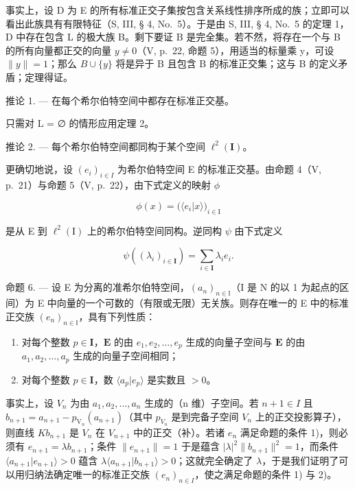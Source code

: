 事实上，设 D 为 E 的所有标准正交子集按包含关系线性排序所成的族；立即可以看出此族具有有限特征（S, III, § 4, No.~5）。于是由 S, III, § 4, No.~5 的定理 1，D 中存在包含 L 的极大族 B。剩下要证 B 是完全集。若不然，将存在一个与 B 的所有向量都正交的向量 \(y \neq 0\)（V, p.~22, 命题 5），用适当的标量乘 y，可设 \(\|y\| = 1\)；那么 \(B \cup \{y\}\) 将是异于 B 且包含 B 的标准正交集；这与 B 的定义矛盾；定理得证。

推论 1. --- 在每个希尔伯特空间中都存在标准正交基。

只需对 L = ∅ 的情形应用定理 2。

推论 2. --- 每个希尔伯特空间都同构于某个空间 \(\ell^2 (\mathbf{I})\)。

更确切地说，设 \((e_{i})_{i\in I}\) 为希尔伯特空间 E 的标准正交基。由命题 4（V, p.~21）与命题 5（V, p.~22），由下式定义的映射 \(\phi\)

\[
\phi (x) = \big (\langle e _ {i} | x \rangle \big) _ {i \in \mathrm{I}}\tag{4}
\]

是从 E 到 \(\ell^2 (\mathrm{I})\) 上的希尔伯特空间同构。逆同构 \(\psi\) 由下式定义

\[
\psi ((\lambda_ {i}) _ {i \in \mathbf {I}}) = \sum_ {i \in \mathbf {I}} \lambda_ {i} e _ {i}.\tag{5}
\]

命题 6. --- 设 E 为分离的准希尔伯特空间，\((a_{n})_{n\in\mathbb{I}}\)（I 是 N 的以 1 为起点的区间）为 E 中向量的一个可数的（有限或无限）无关族。则存在唯一的 E 中的标准正交族 \((e_{n})_{n\in\mathbb{I}}\)，具有下列性质：

\begin{enumerate}
\def\labelenumi{\arabic{enumi})}
\item
  对每个整数 \(p \in \mathbf{I}\)，\(\mathbf{E}\) 的由 \(e_1, e_2, \ldots, e_p\) 生成的向量子空间与 \(\mathbf{E}\) 的由 \(a_1, a_2, \ldots, a_p\) 生成的向量子空间相同；
\item
  对每个整数 \(p \in \mathbf{I}\)，数 \(\langle a_p | e_p \rangle\) 是实数且 \(> 0\)。
\end{enumerate}

事实上，设 \(V_{n}\) 为由 \(a_{1}, a_{2}, ..., a_{n}\) 生成的（n 维）子空间。若 \(n + 1 \in I\) 且 \(b_{n+1} = a_{n+1} - p_{\mathrm{V}_{n}}(a_{n+1})\)（其中 \(p_{V_{n}}\) 是到完备子空间 \(V_{n}\) 上的正交投影算子），则直线 \(Kb_{n+1}\) 是 \(V_{n}\) 在 \(V_{n+1}\) 中的正交（补）。若诸 \(e_{n}\) 满足命题的条件 1)，则必须有 \(e_{n+1} = \lambda b_{n+1}\)；条件 \(\|e_{n+1}\| = 1\) 于是蕴含 \(|\lambda|^2 \|b_{n+1}\|^2 = 1\)，而条件 \(\langle a_{n+1}|e_{n+1} \rangle > 0\) 蕴含 \(\lambda \langle a_{n+1}|b_{n+1} \rangle > 0\)；这就完全确定了 \(\lambda\)，于是我们证明了可以用归纳法确定唯一的标准正交族 \((e_n)_{n\in I}\)，使之满足命题的条件 1) 与 2)。

